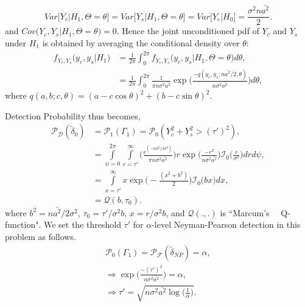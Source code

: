 \documentclass[a4paper,english,12pt]{article}
\begin{document}
\begin{equation*}
Var\big[Y_c|H_1, \Theta=\theta\big]=
Var\big[Y_s|H_1, \Theta=\theta\big]
=Var\big[Y_c|H_0\big]
=\frac{\sigma^2n\bar{a^2}}{2}.
\end{equation*}
and $Cov\big(Y_c,Y_s|H_1, \Theta=\theta\big)=0$. Hence the joint unconditioned pdf of $Y_c$ and $Y_s$ under $H_1$ is obtained by averaging the conditional density over $\theta$:
\begin{equation*}
\begin{aligned}
f_{Y_c,Y_s}\big(y_c,y_s|H_1\big)
&=\frac{1}{2\pi} \int_0^{2\pi}f_{Y_c,Y_s}\big(y_c,y_s|H_1, \Theta=\theta\big) d\theta, \\
&=\frac{1} {2\pi} \int_0^{2\pi} \frac{1}{\pi n\sigma^2\bar{a^2}} \exp\bigg(\frac{ -q(y_c,y_s;n\bar{a^2}/2,\theta)}{n\sigma^2\bar{a^2}}\bigg) d\theta,
\end{aligned}
\end{equation*}
where $q(a,b;c,\theta)=(a-c\cos\theta)^2+(b-c\sin\theta)^2$.
\par Detection Probability thus becomes,
\begin{equation*}
\begin{aligned}
\mathcal{P_D}(\tilde{\delta}_{0}) 
&=\mathcal{P}_1(\Gamma_1)   
= \mathcal{P}_0(Y_c^2+Y_s^2>(\tau')^2), \\
&= \int\limits_{\psi=0}^{2\pi}\int \limits_{r=\tau'}^{\infty}\bigg(\frac{e^{(-n\bar{a^2}/4\sigma^2)}}{\pi n\sigma^2\bar{a^2}}\bigg) r  \exp\bigg(\frac{ -r^2}{n\sigma^2\bar{a^2}}\bigg) \mathcal{I}_0\bigg(\frac{r}{\sigma^2}\bigg)dr d\psi,  \\
&=\int \limits_{x=\tau'}^{\infty}x\exp\bigg(-\frac{(x^2+b^2)}{2}\bigg)\mathcal{I}_0\big(bx\big) dx, \\
&=\mathcal{Q}(b,\tau_0).
\end{aligned}
\end{equation*}
where $b^2=n\bar{a^2}/2\sigma^2$, $\tau_0= \tau'/ \sigma^2b$, $x=r/\sigma^2b$, and $\mathcal{Q}(.,.)$ is ``Marcum's \ \ Q-function". We set the threshold $\tau'$ for $\alpha$-level  Neyman-Pearson detection in this problem  as follows. 
\begin{equation*}
\begin{aligned}
\mathcal{P}_0(\Gamma_1)  =  \mathcal{P_F}(\tilde{\delta}_{NP})  =  \alpha, \\
\Rightarrow  \exp\bigg(\frac{ -(\tau')^2}{n\sigma^2\bar{a^2}}\bigg)=\alpha, \\
\Rightarrow
\tau'= \sqrt{n\sigma^2\bar{a^2}\log\bigg(\frac{1}{\alpha}\bigg)}. 
\end{aligned}
\end{equation*}
\end{document}
